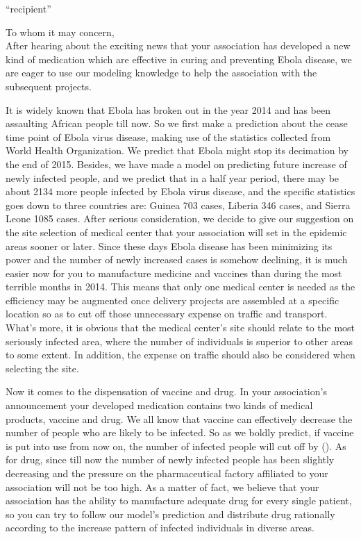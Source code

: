 \documentclass[11pt]{article}
\begin{document}
 \begin{letter}{``recipient''}

To whom it may concern, \\

    After hearing about the exciting news that your association has developed a new kind of medication which are effective in curing and preventing Ebola disease, we are eager to use our modeling knowledge to help the association with the subsequent projects. 
    
    It is widely known that Ebola has broken out in the year 2014 and has been assaulting African people till now. So we first make a prediction about the cease time point of Ebola virus disease, making use of the statistics collected from World Health Organization. We predict that Ebola might stop its decimation by the end of 2015. Besides, we have made a model on predicting future increase of newly infected people, and we predict that in a half year period, there may be about 2134 more people infected by Ebola virus disease, and the specific statistics goes down to three countries are: Guinea 703 cases, Liberia 346 cases, and Sierra Leone 1085 cases. After serious consideration, we decide to give our suggestion on the site selection of medical center that your association will set in the epidemic areas sooner or later. Since these days Ebola disease has been minimizing its power and the number of newly increased cases is somehow declining, it is much easier now for you to manufacture medicine and vaccines than during the most terrible months in 2014. This means that only one medical center is needed as the efficiency may be augmented once delivery projects are assembled at a specific location so as to cut off those unnecessary expense on traffic and transport. What's more, it is obvious that the medical center's site should relate to the most seriously infected area, where the number of individuals is superior to other areas to some extent. In addition, the expense on traffic should also be considered when selecting the site. 
    
    Now it comes to the dispensation of vaccine and drug. In your association's announcement your developed medication contains two kinds of medical products, vaccine and drug. We all know that vaccine can effectively decrease the number of people who are likely to be infected. So as we boldly predict, if vaccine is put into use from now on, the number of infected people will cut off by (). As for drug, since till now the number of newly infected people has been slightly decreasing and the pressure on the pharmaceutical factory affiliated to your association will not be too high. As a matter of fact, we believe that your association has the ability to manufacture adequate drug for every single patient, so you can try to follow our model's prediction and distribute drug rationally according to the increase pattern of infected individuals in diverse areas.
    
    



\end{letter}


\medskip


\end{document}
